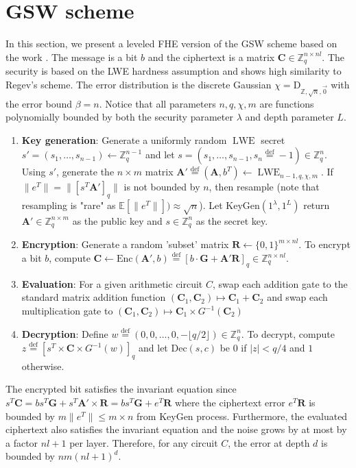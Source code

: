 \section{GSW scheme}
In this section, we present a leveled FHE version of the GSW scheme based on the work \cite{Hal18}. The message is a bit $b$ and the ciphertext is a matrix $\textbf{C} \in \mathbb{Z}_q^{n \times nl}$. The security is based on the LWE hardness assumption and shows high similarity to Regev's scheme. The error distribution is the discrete Gaussian $\chi = \textrm{D}_{\mathbb{Z}, \sqrt{n}, \vec{0}}$ with the error bound $\beta = n$. Notice that all parameters $n, q, \chi, m$ are functions polynomially bounded by both the security parameter $\lambda$ and depth parameter $L$.
\begin{enumerate}
    \item \textbf{Key generation}: Generate a uniformly random $\operatorname{LWE}$ secret $s' = (s_1, \dots, s_{n-1}) \leftarrow \mathbb{Z}_q^{n-1}$ and let $s = (s_1, \dots, s_{n-1}, s_n \stackrel{\mathrm{def}}{=} -1) \in \mathbb{Z}_q^{n}$. Using $s'$, generate the $n \times m$ matrix $\textbf{A}' \stackrel{\mathrm{def}}{=} (\textbf{A}, b^T) \leftarrow \operatorname{LWE}_{n-1,q,\chi,m}$. If $\|e^T\| = \|[s^T\textbf{A}']_q\|$ is not bounded by $n$, then resample (note that resampling is "rare" as $\mathbb{E}[\|e^T\|]) \approx \sqrt{n}$). Let $\text{KeyGen}(1^\lambda, 1^L)$ return $\textbf{A}' \in \mathbb{Z}_q^{n \times m}$ as the public key and $s \in \mathbb{Z}_q^n$ as the secret key. 
    \item \textbf{Encryption}: Generate a random 'subset' matrix $\textbf{R} \leftarrow \{0,1\}^{m \times nl}$. To encrypt a bit $b$, compute $\textbf{C} \leftarrow \text{Enc}(\textbf{A}',b) \stackrel{\mathrm{def}}{=} [b \cdot \textbf{G} + \textbf{A}'\textbf{R}]_q \in \mathbb{Z}_q^{n\times nl}$.
    \item \textbf{Evaluation}: For a given arithmetic circuit $C$, swap each addition gate to the standard matrix addition function $(\textbf{C}_1, \textbf{C}_2) \mapsto \textbf{C}_1 + \textbf{C}_2$ and swap each multiplication gate to $(\textbf{C}_1, \textbf{C}_2) \mapsto \textbf{C}_1 \times G^{-1}(\textbf{C}_2)$
    \item \textbf{Decryption}: Define $w \stackrel{\mathrm{def}}{=} (0,0,\dots,0, - \lfloor q/2 \rfloor) \in \mathbb{Z}_q^n$. To decrypt, compute $z \stackrel{\mathrm{def}}{=} [s^T \times \textbf{C} \times G^{-1}(w)]_q$ and let $\text{Dec}(s,c)$ be $0$ if $|z| < q/4$ and $1$ otherwise.
\end{enumerate}
The encrypted bit satisfies the invariant equation since $s^T\textbf{C} = bs^T\textbf{G} + s^T\textbf{A}' \times \textbf{R}= bs^T\textbf{G} + e^T \textbf{R}$ where the ciphertext error $e^T \textbf{R}$ is bounded by $m \|e^T\| \leq m \times n$ from KeyGen process. Furthermore, the evaluated ciphertext also satisfies the invariant equation and the noise grows by at most by a factor $nl + 1$ per layer. Therefore, for any circuit $C$, the error at depth $d$ is bounded by $nm(nl+1)^d$.

